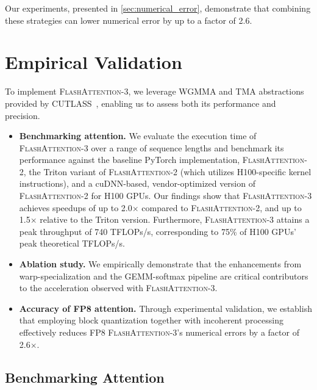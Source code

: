 \begin{enumerate}
Our experiments, presented in \cref{sec:numerical_error}, demonstrate that combining these strategies can lower numerical error by up to a factor of 2.6.

\section{Empirical Validation}
\label{sec:exp}

To implement \textsc{FlashAttention-3}, we leverage WGMMA and TMA abstractions provided by CUTLASS~\citep{Thakkar_CUTLASS_2023}, enabling us to assess both its performance and precision.

\begin{itemize}

\item \textbf{Benchmarking attention.} We evaluate the execution time of \textsc{FlashAttention-3} over a range of sequence lengths and benchmark its performance against the baseline PyTorch implementation, \textsc{FlashAttention-2}, the Triton variant of \textsc{FlashAttention-2} (which utilizes H100-specific kernel instructions), and a cuDNN-based, vendor-optimized version of \textsc{FlashAttention-2} for H100 GPUs. Our findings show that \textsc{FlashAttention-3} achieves speedups of up to 2.0$\times$ compared to \textsc{FlashAttention-2}, and up to 1.5$\times$ relative to the Triton version. Furthermore, \textsc{FlashAttention-3} attains a peak throughput of 740 TFLOPs/s, corresponding to 75\% of H100 GPUs’ peak theoretical TFLOPs/s.

\item \textbf{Ablation study.} We empirically demonstrate that the enhancements from warp-specialization and the GEMM-softmax pipeline are critical contributors to the acceleration observed with \textsc{FlashAttention-3}.

\item \textbf{Accuracy of FP8 attention.} Through experimental validation, we establish that employing block quantization together with incoherent processing effectively reduces FP8 \textsc{FlashAttention-3}’s numerical errors by a factor of 2.6$\times$.
\end{itemize}

\subsection{Benchmarking Attention}
\label{subsec:benchmark_attn}


\end{enumerate}
